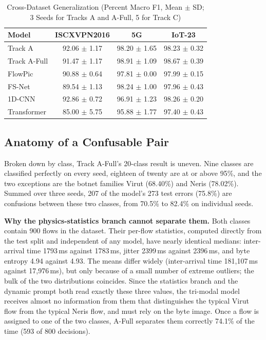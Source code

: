 \documentclass[journal]{IEEEtran}
\begin{document}
\begin{table}[t]
\caption{Cross-Dataset Generalization (Percent Macro F1, Mean $\pm$ SD; 3 Seeds for Tracks A and A-Full, 5 for Track C)}
\label{tab:cross}
\centering
\renewcommand{\arraystretch}{1.2}
\setlength{\tabcolsep}{4pt}
\begin{tabular}{|l|c|c|c|}
\hline
\textbf{Model} & \textbf{ISCXVPN2016} & \textbf{5G} & \textbf{IoT-23} \\
\hline
Track A & 92.06 $\pm$ 1.17 & 98.20 $\pm$ 1.65 & 98.23 $\pm$ 0.32 \\
\hline
Track A-Full & 91.47 $\pm$ 1.17 & 98.91 $\pm$ 1.09 & 98.67 $\pm$ 0.39 \\
\hline
FlowPic & 90.88 $\pm$ 0.64 & 97.81 $\pm$ 0.00 & 97.99 $\pm$ 0.15 \\
\hline
FS-Net & 89.54 $\pm$ 1.13 & 98.24 $\pm$ 1.00 & 97.96 $\pm$ 0.43 \\
\hline
1D-CNN & 92.86 $\pm$ 0.72 & 96.91 $\pm$ 1.23 & 98.26 $\pm$ 0.20 \\
\hline
Transformer & 85.00 $\pm$ 5.75 & 95.88 $\pm$ 1.77 & 97.40 $\pm$ 0.43 \\
\hline
\end{tabular}
\end{table}

\subsection{Anatomy of a Confusable Pair}\label{sec:anatomy}
Broken down by class, Track A-Full's 20-class result is uneven. Nine classes are classified perfectly on every seed, eighteen of twenty are at or above 95\%, and the two exceptions are the botnet families Virut (68.40\%) and Neris (78.02\%). Summed over three seeds, 207 of the model's 273 test errors (75.8\%) are confusions between these two classes, from 70.5\% to 82.4\% on individual seeds.

\textbf{Why the physics-statistics branch cannot separate them.} Both classes contain 900 flows in the dataset. Their per-flow statistics, computed directly from the test split and independent of any model, have nearly identical medians: inter-arrival time 1793\,ms against 1783\,ms, jitter 2399\,ms against 2396\,ms, and byte entropy 4.94 against 4.93. The means differ widely (inter-arrival time 181{,}107\,ms against 17{,}976\,ms), but only because of a small number of extreme outliers; the bulk of the two distributions coincides. Since the statistics branch and the dynamic prompt both read exactly these three values, the tri-modal model receives almost no information from them that distinguishes the typical Virut flow from the typical Neris flow, and must rely on the byte image. Once a flow is assigned to one of the two classes, A-Full separates them correctly 74.1\% of the time (593 of 800 decisions).
\end{document}
